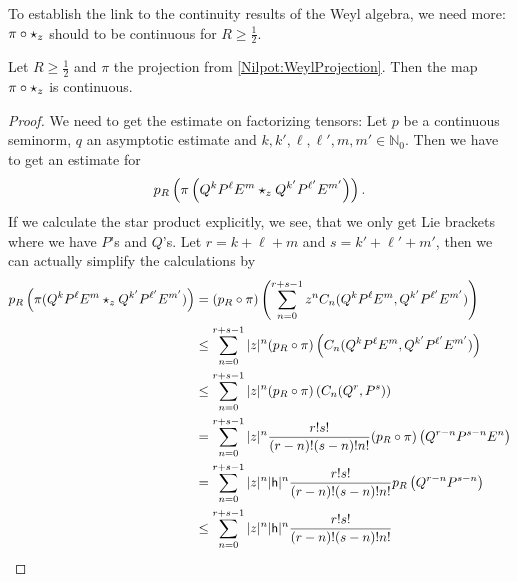 To establish the link to the continuity results of the Weyl algebra,
we need more: $\pi \circ \star_z$ should to be continuous for $R \geq \frac 
1 2$.
\begin{proposition}
    \label{proposition:ContinuousProductInWeyl}%
    Let $R \geq \frac{1}{2}$ and $\pi$ the projection from
    \eqref{Nilpot:WeylProjection}. Then the map $\pi \circ
    \star_z$ is continuous.
\end{proposition}
\begin{proof}
    We need to get the estimate on factorizing tensors: Let $p$ be a
    continuous seminorm, $q$ an asymptotic estimate and $k, k',
    \ell, \ell', m, m' \in \mathbb{N}_0$. Then we have to get an
    estimate for
    \begin{align*}
        p_R \left(
            \pi\left(
                Q^k P^{\ell} E^m \star_z Q^{k'} P^{\ell'} E^{m'}
            \right)
        \right).
    \end{align*}
    If we calculate the star product explicitly, we see, that we only
    get Lie brackets where we have $P$'s and $Q$'s. Let $r = k + \ell
    + m$ and $s = k' + \ell' + m'$, then we can actually simplify the
    calculations by
    \begin{align*}
        p_R \left(
        \pi(Q^k P^{\ell} E^m
        \ostar_z    Q^{k'} P^{\ell'} E^{m'}
        ) \right)
        & =
        (p_R \circ \pi) \left(
        \sum\limits_{n=0}^{r + s - 1}
        z^n C_n(Q^k P^{\ell} E^m,
        Q^{k'} P^{\ell'} E^{m'})
        \right)
        \\
        & \leq
        \sum\limits_{n=0}^{r + s - 1}
        |z|^n
        (p_R \circ \pi) \left(
        C_n(Q^k P^{\ell} E^m,
        Q^{k'} P^{\ell'} E^{m'})
        \right)
        \\
        & \leq
        \sum\limits_{n=0}^{r + s - 1}
        |z|^n
        (p_R \circ \pi) \left(
        C_n(Q^r, P^s)
        \right)
        \\
        & =
        \sum\limits_{n=0}^{r + s - 1}
        |z|^n
        \frac{r! s!}{(r-n)! (s-n)! n!}
        (p_R \circ \pi) \left(
        Q^{r-n} P^{s-n} E^n
        \right)
        \\
        & =
        \sum\limits_{n=0}^{r + s - 1}
        |z|^n |\mathsf{h}|^n
        \frac{r! s!}{(r-n)! (s-n)! n!}
        p_R \left(
        Q^{r-n} P^{s-n}
        \right)
        \\
        & \leq
        \sum\limits_{n=0}^{r + s - 1}
        |z|^n |\mathsf{h}|^n
        \frac{r! s!}{(r-n)! (s-n)! n!}

\end{align*}
\end{proof}
